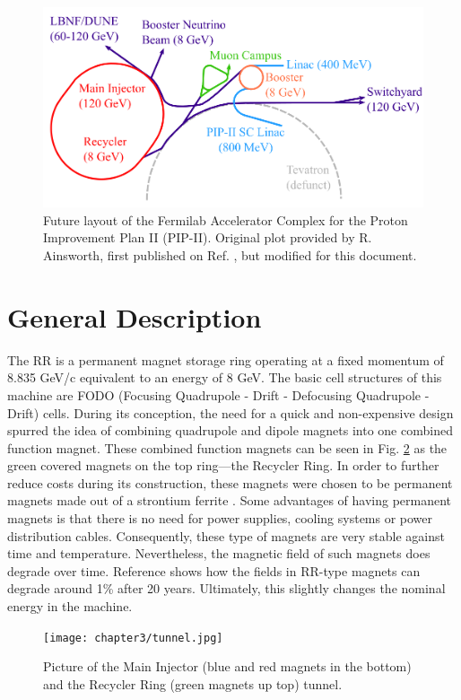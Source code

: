 \begin{figure}[H]
   \centering
   \includegraphics[width=\columnwidth]{chapter3/complexPIPII.png}
   \caption{Future layout of the Fermilab Accelerator Complex for the Proton Improvement Plan II (PIP-II). Original plot provided by R. Ainsworth, first published on Ref. \cite{rr1}, but modified for this document.}
   \label{fig:fnalpip2}
\end{figure}

\section{\label{sec:rrgen}General Description}

The RR is a permanent magnet storage ring operating at a fixed momentum of 8.835 GeV/c equivalent to an energy of 8 GeV. The basic cell structures of this machine are FODO (Focusing Quadrupole - Drift - Defocusing Quadrupole - Drift) cells. During its conception, the need for a quick and non-expensive design spurred the idea of combining quadrupole and dipole magnets into one combined function magnet. These combined function magnets can be seen in Fig. \ref{fig:rrtunnel} as the green covered magnets on the top ring---the Recycler Ring. In order to further reduce costs during its construction, these magnets were chosen to be permanent magnets made out of a strontium ferrite \cite{rr0}. Some advantages of having permanent magnets is that there is no need for power supplies, cooling systems or power distribution cables. Consequently, these type of magnets are very stable against time and temperature. Nevertheless, the magnetic field of such magnets does degrade over time. Reference \cite{rr1} shows how the fields in RR-type magnets can degrade around 1\% after 20 years. Ultimately, this slightly changes the nominal energy in the machine. 

\begin{figure}[H]
   \centering
   \texttt{[image: chapter3/tunnel.jpg]}
   \caption{Picture of the Main Injector (blue and red magnets in the bottom) and the Recycler Ring (green magnets up top) tunnel.}
   \label{fig:rrtunnel}
\end{figure}


